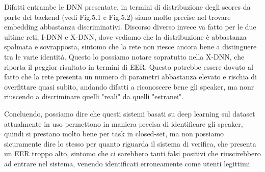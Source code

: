 Difatti entrambe le DNN presentate, in termini di distribuzione degli scores da parte del backend (vedi Fig.5.1 e Fig.5.2) siano molto precise
nel trovare embedding abbastanza discriminativi. Discorso diverso invece va fatto per le due ultime reti,
I-DNN e X-DNN, dove vediamo che la distribuzione è abbastanza spalmata e sovrapposta, sintomo che la rete non riesce ancora bene a distinguere tra le varie identità.
Questo lo possiamo notare sopratutto  nella X-DNN, che riporta il peggior risultato in termini di EER. Questo potrebbe essere dovuto al fatto che la rete
presenta un numero di parametri abbastanza elevato e rischia di overfittare quasi subito, andando difatti a riconoscere bene gli speaker, ma nonr riuscendo
a discriminare quelli "reali" da quelli "estranei". 

Concluendo, possiamo dire che questi sistemi basati su deep learning sul dataset attualmente in uso permettono in maniera precisa di identificare gli speaker,
quindi si prestano molto bene per task in closed-set, ma non possiamo sicuramente dire lo stesso per quanto riguarda il sistema di verifica, che presenta un EER troppo alto,
sintomo che ci sarebbero tanti falsi positivi che riuscirebbero ad entrare nel sistema, venendo identificati erroneamente come utenti legittimi